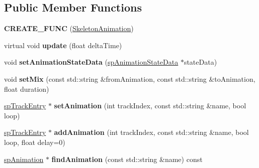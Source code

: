 \subsection*{Public Member Functions}
\begin{DoxyCompactItemize}
\item 
\mbox{\label{classspine_1_1SkeletonAnimation_ae4a1e17f3d039a1ce7bf91da489bde0e}} 
{\bfseries C\+R\+E\+A\+T\+E\+\_\+\+F\+U\+NC} (\hyperlink{classspine_1_1SkeletonAnimation}{Skeleton\+Animation})
\item 
\mbox{\label{classspine_1_1SkeletonAnimation_a27e7ca22105f83dc1952aabac6cf59f3}} 
virtual void {\bfseries update} (float delta\+Time)
\item 
\mbox{\label{classspine_1_1SkeletonAnimation_a8c3eb769dd4f30a2324d9a66277068ca}} 
void {\bfseries set\+Animation\+State\+Data} (\hyperlink{structspAnimationStateData}{sp\+Animation\+State\+Data} $\ast$state\+Data)
\item 
\mbox{\label{classspine_1_1SkeletonAnimation_a33cb9b6a5985866155ccf150eaa9734c}} 
void {\bfseries set\+Mix} (const std\+::string \&from\+Animation, const std\+::string \&to\+Animation, float duration)
\item 
\mbox{\label{classspine_1_1SkeletonAnimation_a7c5aeb0183f77ff7c35b380be9be772e}} 
\hyperlink{structspTrackEntry}{sp\+Track\+Entry} $\ast$ {\bfseries set\+Animation} (int track\+Index, const std\+::string \&name, bool loop)
\item 
\mbox{\label{classspine_1_1SkeletonAnimation_ac589093c336cbee7f4d2c0cc8a5f5bb0}} 
\hyperlink{structspTrackEntry}{sp\+Track\+Entry} $\ast$ {\bfseries add\+Animation} (int track\+Index, const std\+::string \&name, bool loop, float delay=0)
\item 
\mbox{\label{classspine_1_1SkeletonAnimation_abea9f73c0561a60093592a27c48626cb}} 
\hyperlink{structspAnimation}{sp\+Animation} $\ast$ {\bfseries find\+Animation} (const std\+::string \&name) const
\item 
\mbox{\label{classspine_1_1SkeletonAnimation_a7164a498ebca1ec7074705c8eaa00975}} 

\end{DoxyCompactItemize}
